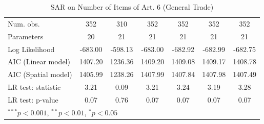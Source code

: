 \begin{table}[!h]
\begin{center}
\begin{tabular}{l c c c c c c }
Num. obs.               & 352           & 310          & 352           & 352           & 352           & 352           \\
Parameters              & 20            & 21           & 21            & 21            & 21            & 21            \\
Log Likelihood          & -683.00       & -598.13      & -683.00       & -682.92       & -682.99       & -682.75       \\
AIC (Linear model)      & 1407.20       & 1236.36      & 1409.20       & 1409.08       & 1409.17       & 1408.78       \\
AIC (Spatial model)     & 1405.99       & 1238.26      & 1407.99       & 1407.84       & 1407.98       & 1407.49       \\
LR test: statistic      & 3.21          & 0.09         & 3.21          & 3.24          & 3.19          & 3.28          \\
LR test: p-value        & 0.07          & 0.76         & 0.07          & 0.07          & 0.07          & 0.07          \\
\bottomrule
\multicolumn{7}{l}{\scriptsize{$^{***}p<0.001$, $^{**}p<0.01$, $^*p<0.05$}}
\end{tabular}
\caption{SAR on Number of Items of Art. 6 (General Trade)}
\label{table:coefficients}
\end{center}
\end{table}
